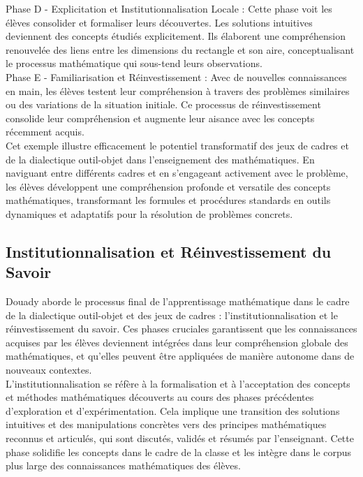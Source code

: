 Phase D - Explicitation et Institutionnalisation Locale :
Cette phase voit les élèves consolider et formaliser leurs découvertes.
Les solutions intuitives deviennent des concepts étudiés explicitement.
Ils élaborent une compréhension renouvelée des liens entre les dimensions du rectangle et son aire,
conceptualisant le processus mathématique qui sous-tend leurs observations.\\

Phase E - Familiarisation et Réinvestissement : Avec de nouvelles connaissances en main,
les élèves testent leur compréhension à travers des problèmes similaires ou des variations de la situation initiale.
Ce processus de réinvestissement consolide leur compréhension et augmente leur aisance avec les concepts récemment acquis.\\

Cet exemple illustre efficacement le potentiel transformatif des jeux de cadres et de la dialectique outil-objet dans l'enseignement des mathématiques.
En naviguant entre différents cadres et en s'engageant activement avec le problème,
les élèves développent une compréhension profonde et versatile des concepts mathématiques,
transformant les formules et procédures standards en outils dynamiques et adaptatifs pour la résolution de problèmes concrets.

\subsection{Institutionnalisation et Réinvestissement du Savoir}

Douady aborde le processus final de l'apprentissage mathématique dans le cadre de la dialectique outil-objet et des jeux de cadres :
l'institutionnalisation et le réinvestissement du savoir.
Ces phases cruciales garantissent que les connaissances acquises par les élèves deviennent intégrées dans leur compréhension globale des mathématiques,
et qu'elles peuvent être appliquées de manière autonome dans de nouveaux contextes.\\

L'institutionnalisation se réfère à la formalisation et à l'acceptation des concepts et méthodes mathématiques découverts au cours des phases précédentes d'exploration et d'expérimentation.
Cela implique une transition des solutions intuitives et des manipulations concrètes vers des principes mathématiques reconnus et articulés,
qui sont discutés,
validés et résumés par l'enseignant.
Cette phase solidifie les concepts dans le cadre de la classe et les intègre dans le corpus plus large des connaissances mathématiques des élèves.\\

